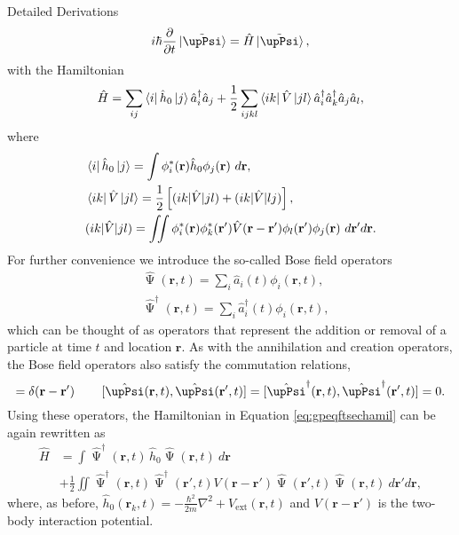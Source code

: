 \begin{chapter}{Detailed Derivations\label{app:App2}}
\begin{equation*}
i \hbar\frac{\partial}{\partial t}\ket{\tilde{\upPsi}} = \hat{H}\ket{\tilde{\upPsi}},
\label{eq:gpeqftsecscho}
\end{equation*}
with the Hamiltonian
\begin{equation}
\hat{H} = \sum_{ij}\bra{i}\hat{h}_0\ket{j}\hat{a}_i^\dagger\hat{a}_j + \frac{1}{2}\sum_{ijkl} \bra{ik}\hat{V}\ket{jl}\hat{a}_i^\dagger\hat{a}_k^\dagger\hat{a}_j\hat{a}_l,
\label{eq:gpeqftsechamil}
\end{equation}
where
\begin{align*}
&\bra{i}\hat{h}_0\ket{j} = \int \phi_i^*(\mathbf{r})\hat{h}_0\phi_j(\mathbf{r})~d\mathbf{r},\\
&\bra{ik}\hat{V}\ket{jl} = \frac{1}{2}\left [ (ik|\hat{V}|jl) + (ik|\hat{V}|lj) \right ],\\
&(ik|\hat{V}|jl) = \iint \phi_i^*(\mathbf{r})\phi_k^*(\mathbf{r}')\hat{V}(\mathbf{r}-\mathbf{r}')\phi_l(\mathbf{r}')\phi_j(\mathbf{r})~d\mathbf{r}'d\mathbf{r}.
\end{align*}
For further convenience we introduce the so-called Bose field operators
\begin{align*}
&\hat{\upPsi}(\mathbf{r},t) = \sum_i \hat{a}_i(t)\phi_i(\mathbf{r},t),\\
&\hat{\upPsi}^\dagger(\mathbf{r},t) = \sum_i \hat{a}^\dagger_i(t)\phi_i(\mathbf{r},t),
\end{align*}
which can be thought of as operators that represent the addition or removal of a particle at time $t$ and location $\mathbf{r}$. As with the annihilation and creation operators, the Bose field operators also satisfy the commutation relations,
\begin{equation}
[\hat{\upPsi}(\mathbf{r},t),\hat{\upPsi}^\dagger(\mathbf{r}',t)]=\delta(\mathbf{r}-\mathbf{r}')\hspace{0.3in}[\hat{\upPsi}(\mathbf{r},t),\hat{\upPsi}(\mathbf{r}',t)]=[\hat{\upPsi}^\dagger(\mathbf{r},t),\hat{\upPsi}^\dagger(\mathbf{r}',t)]=0.
\label{eq:gpeqftbfocomm}
\end{equation}
Using these operators, the Hamiltonian in Equation \ref{eq:gpeqftsechamil} can be again rewritten as
\begin{equation}
\begin{split}
\hat{H} &= \int \hat{\upPsi}^\dagger(\mathbf{r},t)\,\hat{h}_0 \hat{\upPsi}(\mathbf{r},t)~d\mathbf{r}\\
&+\frac{1}{2}\iint \hat{\upPsi}^\dagger(\mathbf{r},t)\hat{\upPsi}^\dagger(\mathbf{r}',t)V(\mathbf{r}-\mathbf{r}')\hat{\upPsi}(\mathbf{r}',t)\hat{\upPsi}(\mathbf{r},t)~d\mathbf{r}'d\mathbf{r},
\label{eq:gpeqftbfohamil}
\end{split}
\end{equation}
where, as before, $\hat{h}_0(\mathbf{r}_k,t) = -\frac{\hbar^2}{2m}\nabla^2+V_{\mathrm{ext}}(\mathbf{r},t)$ and $V(\mathbf{r}-\mathbf{r}')$ is the two-body interaction potential.


\end{chapter}
